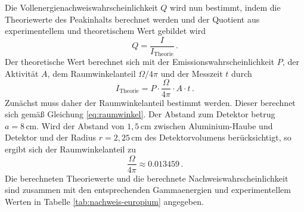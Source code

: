 \noindent
Die Vollenergienachweiswahrscheinlichkeit $Q$ wird nun bestimmt, indem die Theoriewerte des Peakinhalts berechnet werden
und der Quotient aus experimentellem und theoretischem Wert gebildet wird
\begin{equation}
    Q = \frac{I}{I_\text{Theorie}} \, .
\end{equation}
Der theoretische Wert berechnet sich mit der Emissionswahrscheinlichkeit $P$, der Aktivität $A$, dem Raumwinkelanteil $\Omega / 4 \pi$ und der Messzeit $t$ durch
\begin{equation}
    \label{eq:inhalt_theorie}
    I_\text{Theorie} = P \cdot \frac{\Omega}{4 \pi} \cdot A \cdot t \, .
\end{equation}
Zunächst muss daher der Raumwinkelanteil bestimmt werden. 
Dieser berechnet sich gemäß Gleichung \eqref{eq:raumwinkel}. 
Der Abstand zum Detektor betrug $a = 8 \, \text{cm}$. Wird der Abstand von $1,5 \, \text{cm}$ zwischen Aluminium-Haube und Detektor
und der Radius $r = 2,25 \, \text{cm}$ des Detektorvolumens berücksichtigt, so ergibt sich
der Raumwinkelanteil zu 
\begin{equation}
    \frac{\Omega}{4 \pi} \approx 0.013459 \, .
\end{equation}
Die berechneten Theoriewerte und die berechnete Nachweiswahrscheinlichkeit sind zusammen mit den entsprechenden Gammaenergien
und experimentellem Werten in Tabelle \ref{tab:nachweis-europium} angegeben.
